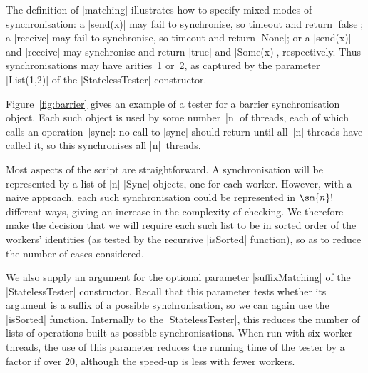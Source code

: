 The definition of |matching| illustrates how to specify mixed modes of
synchronisation: a |send(x)| may fail to synchronise, so timeout and return
|false|; a |receive| may fail to synchronise, so timeout and return |None|; or
a |send(x)| and |receive| may synchronise and return |true| and |Some(x)|,
respectively.  Thus synchronisations may have arities~1 or~2, as captured by
the parameter |List(1,2)| of the |StatelessTester| constructor.


Figure~\ref{fig:barrier}  gives an example of a
tester for a barrier synchronisation object.  Each such object is used by some
number~|n| of threads, each of which calls an operation~|sync|: no call to
|sync| should return until all~|n| threads have called it, so this
synchronises all |n|~threads.

Most aspects of the script are straightforward.  A synchronisation will be
represented by a list of |n| |Sync| objects, one for each worker.  However,
with a naive approach, each such synchronisation could be represented in
$\sm{n}!$ different ways, giving an increase in the complexity of checking.
We therefore make the decision that we will require each such list to be in
sorted order of the workers' identities (as tested by the recursive |isSorted|
function), so as to reduce the number of cases considered. 

We also supply an argument for the optional parameter |suffixMatching| of the
|StatelessTester| constructor.  Recall that this parameter tests whether its
argument is a suffix of a possible synchronisation, so we can again use the
|isSorted| function.  Internally to the |StatelessTester|, this reduces the
number of lists of operations built as possible synchronisations.  When run
with six worker threads, the use of this parameter reduces the running time of
the tester by a factor if over 20, although the speed-up is less with fewer
workers.

